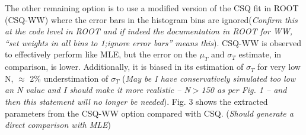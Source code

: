 \documentclass[12pt]{article}
\begin{document}
The other remaining option is to use a modified version of the CSQ fit in ROOT (CSQ-WW) where the error bars in the histogram bins are ignored(\textit{Confirm this at the code level in ROOT and if indeed the documentation in ROOT for WW, ``set weights in all bins to 1;ignore error bars'' means this}). CSQ-WW is observed to effectively perform like MLE, but the error on the $\mu_{T}$ and $\sigma_{T}$ estimate, in comparison, is lower. Additionally, it is biased in its estimation of $\sigma_{T}$ for very low N, $\approx$ 2\% understimation of $\sigma_{T}$ (\textit{May be I have conservatively simulated too low an N value and I should make it more realistic -- N$>$150 as per Fig. 1 -- and then this statement will no longer be needed}). Fig. 3 shows the extracted parameters from the CSQ-WW option compared with CSQ. (\textit{Should generate a direct comparison with MLE})
\end{document}
